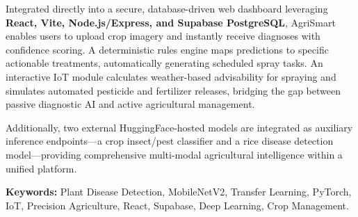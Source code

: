 \documentclass[12pt,a4paper]{report}
\begin{document}
Integrated directly into a secure, database-driven web dashboard leveraging \textbf{React, Vite, Node.js/Express, and Supabase PostgreSQL}, AgriSmart enables users to upload crop imagery and instantly receive diagnoses with confidence scoring. A deterministic rules engine maps predictions to specific actionable treatments, automatically generating scheduled spray tasks. An interactive IoT module calculates weather-based advisability for spraying and simulates automated pesticide and fertilizer releases, bridging the gap between passive diagnostic AI and active agricultural management.

Additionally, two external HuggingFace-hosted models are integrated as auxiliary inference endpoints---a crop insect/pest classifier and a rice disease detection model---providing comprehensive multi-modal agricultural intelligence within a unified platform.

\bigskip
\noindent\textbf{Keywords:} Plant Disease Detection, MobileNetV2, Transfer Learning, PyTorch, IoT, Precision Agriculture, React, Supabase, Deep Learning, Crop Management.

\newpage

\tableofcontents
\newpage
\listoffigures
\newpage
\listoftables
\newpage

\end{document}
